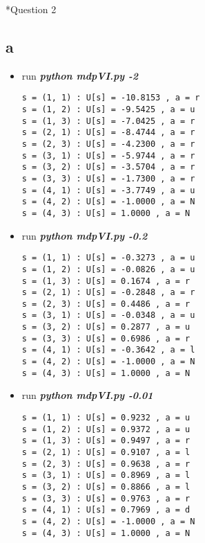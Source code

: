 \documentclass[12pt]{amsart}
\makeatletter
\renewcommand{\section}{\@startsection{section}{1}{0mm}
{-\baselineskip}{0.5\baselineskip}{\bf\leftline}}
\makeatother
\begin{document}
\section*{Question 2}
\subsection*{a}
\begin{itemize}
\item run \textit{\textbf{python mdpVI.py -2}}
\begin{verbatim}
s = (1, 1) : U[s] = -10.8153 , a = r
s = (1, 2) : U[s] = -9.5425 , a = u
s = (1, 3) : U[s] = -7.0425 , a = r
s = (2, 1) : U[s] = -8.4744 , a = r
s = (2, 3) : U[s] = -4.2300 , a = r
s = (3, 1) : U[s] = -5.9744 , a = r
s = (3, 2) : U[s] = -3.5704 , a = r
s = (3, 3) : U[s] = -1.7300 , a = r
s = (4, 1) : U[s] = -3.7749 , a = u
s = (4, 2) : U[s] = -1.0000 , a = N
s = (4, 3) : U[s] = 1.0000 , a = N
\end{verbatim}
\item run \textit{\textbf{python mdpVI.py -0.2}}
\begin{verbatim}
s = (1, 1) : U[s] = -0.3273 , a = u
s = (1, 2) : U[s] = -0.0826 , a = u
s = (1, 3) : U[s] = 0.1674 , a = r
s = (2, 1) : U[s] = -0.2848 , a = r
s = (2, 3) : U[s] = 0.4486 , a = r
s = (3, 1) : U[s] = -0.0348 , a = u
s = (3, 2) : U[s] = 0.2877 , a = u
s = (3, 3) : U[s] = 0.6986 , a = r
s = (4, 1) : U[s] = -0.3642 , a = l
s = (4, 2) : U[s] = -1.0000 , a = N
s = (4, 3) : U[s] = 1.0000 , a = N
\end{verbatim}
\item run \textit{\textbf{python mdpVI.py -0.01}}
\begin{verbatim}
s = (1, 1) : U[s] = 0.9232 , a = u
s = (1, 2) : U[s] = 0.9372 , a = u
s = (1, 3) : U[s] = 0.9497 , a = r
s = (2, 1) : U[s] = 0.9107 , a = l
s = (2, 3) : U[s] = 0.9638 , a = r
s = (3, 1) : U[s] = 0.8969 , a = l
s = (3, 2) : U[s] = 0.8866 , a = l
s = (3, 3) : U[s] = 0.9763 , a = r
s = (4, 1) : U[s] = 0.7969 , a = d
s = (4, 2) : U[s] = -1.0000 , a = N
s = (4, 3) : U[s] = 1.0000 , a = N
\end{verbatim}
\end{itemize}
\end{document}
